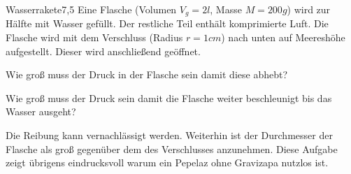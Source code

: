 \begin{problem}{Wasserrakete}{7,5}
Eine Flasche (Volumen $V_g = 2  \unit{l}$, Masse $M = 200 \unit{g}$) wird zur Hälfte mit Wasser gefüllt. Der restliche Teil enthält komprimierte Luft. Die Flasche wird mit dem Verschluss (Radius $r = 1 \unit{cm}$) nach unten auf Meereshöhe aufgestellt. Dieser wird anschließend geöffnet.
\begin{abcenum}
\item Wie groß muss der Druck in der Flasche sein damit diese abhebt?
\item Wie groß muss der Druck sein damit die Flasche weiter beschleunigt bis das Wasser ausgeht?
\end{abcenum}
Die Reibung kann vernachlässigt werden. Weiterhin ist der Durchmesser der Flasche als groß gegenüber dem des Verschlusses anzunehmen. Diese Aufgabe zeigt übrigens eindrucksvoll warum ein Pepelaz ohne Gravizapa nutzlos ist.
\end{problem}

